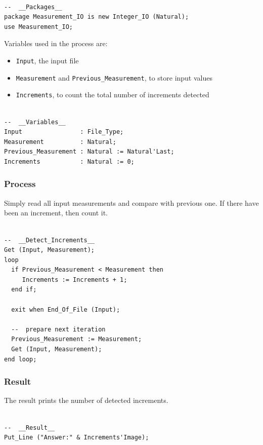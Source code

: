\documentclass[11pt]{article}
\begin{document}
\begin{verbatim}

--  __Packages__
package Measurement_IO is new Integer_IO (Natural);
use Measurement_IO;

\end{verbatim}

Variables used in the process are:

\begin{itemize}
\item \texttt{Input}, the input file
\item \texttt{Measurement} and \texttt{Previous\_Measurement}, to store input values
\item \texttt{Increments}, to count the total number of increments detected
\end{itemize}

\begin{verbatim}

--  __Variables__
Input                : File_Type;
Measurement          : Natural;
Previous_Measurement : Natural := Natural'Last;
Increments           : Natural := 0;

\end{verbatim}

\subsubsection{Process}
\label{sec:orgc575d94}
Simply read all input measurements and compare with previous one. If there have
been an increment, then count it.

\begin{verbatim}

--  __Detect_Increments__
Get (Input, Measurement);
loop
  if Previous_Measurement < Measurement then
     Increments := Increments + 1;
  end if;

  exit when End_Of_File (Input);

  --  prepare next iteration
  Previous_Measurement := Measurement;
  Get (Input, Measurement);
end loop;

\end{verbatim}

\subsubsection{Result}
\label{sec:orgdf09220}
The result prints the number of detected increments.

\begin{verbatim}

--  __Result__
Put_Line ("Answer:" & Increments'Image);

\end{verbatim}
\end{document}
